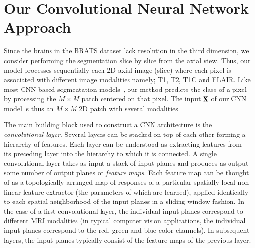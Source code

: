 \documentclass[final,5p,times,twocolumn]{elsarticle}
\newcommand{\HL}[1]{\textcolor{red}{\small{}[\textbf{Hugo:} #1]}}
\begin{document}



\section{Our Convolutional Neural Network Approach}
\label{sec:CNNApproach}

Since the brains in the BRATS dataset 
lack resolution in the third dimension, we consider performing the segmentation slice by slice from the axial view. 
Thus, our model processes sequentially each 2D axial image (slice) where each pixel is associated with different image modalities namely; T1, T2, T1C and FLAIR.  Like most CNN-based segmentation models~\citep{pinheiro2014,farabet2013}, our method predicts the class of a pixel by processing the $M\times M$ patch centered on that pixel.  The input ${\bf X}$ of our CNN model is thus an $M\times M$ 2D patch with several modalities.

%


The main building block used to construct a CNN architecture is the {\it convolutional layer}. Several layers can be stacked on top of each other forming a hierarchy of features. Each layer can be understood as extracting features from its preceding layer into the hierarchy to which it is connected. %
A single convolutional layer takes as input a stack of input planes and produces as output some number of output planes or \textit{feature maps}. Each feature map can be thought of as a topologically arranged map of responses of a particular spatially local non-linear feature extractor (the parameters of which are learned), applied identically to each spatial neighborhood of the input planes in a sliding window fashion.  In the case of a first convolutional layer, the individual input planes correspond to different MRI modalities (in typical computer vision applications, the individual input planes correspond to the red, green and blue color channels). In subsequent layers, the input planes typically consist of the feature maps of the previous layer.
\end{document}
